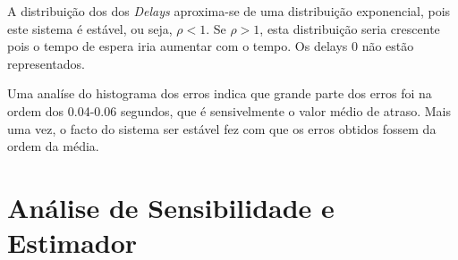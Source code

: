 A distribuição dos dos \textit{Delays} aproxima-se de uma distribuição exponencial, pois este sistema é estável, ou seja, $\rho<1$.
Se $\rho>1$, esta distribuição seria crescente pois o tempo de espera iria aumentar com o tempo. Os delays 0 não estão representados.

Uma analíse do histograma dos erros indica que grande parte dos erros foi na ordem dos 0.04-0.06 segundos, que é sensivelmente o valor médio de atraso.
Mais uma vez, o facto do sistema ser estável fez com que os erros obtidos fossem da ordem da média.

\section*{Análise de Sensibilidade e Estimador}

\begin{figure}[H]
    \begin{floatrow}
    \end{floatrow}
\end{figure}


